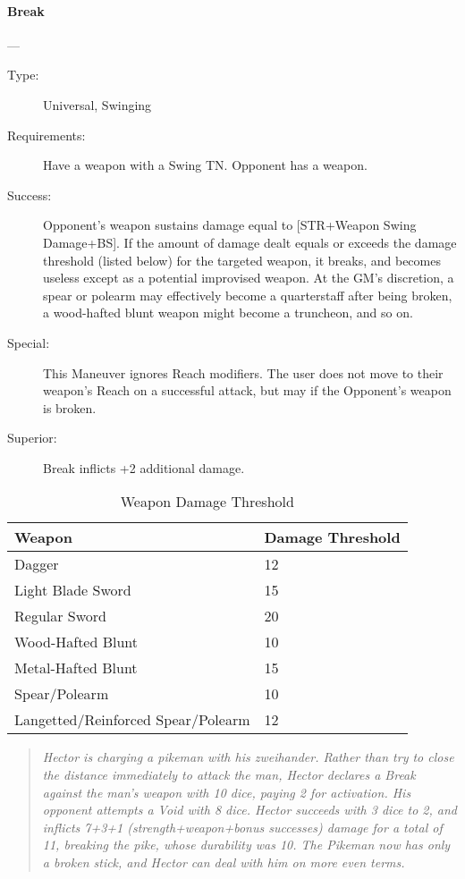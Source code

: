 \documentclass[oneside,11pt,english]{book}
\begin{document}
\paragraph{\large Break \label{man:Break}}---\quad{\large[X$ + $2]}
\vspace{-10pt}
\begin{description}
\item[Type:] Universal, Swinging
\item[Requirements:] Have a weapon with a Swing TN. Opponent has a weapon.
\item[Success:] Opponent’s weapon sustains damage equal to [STR+Weapon Swing
  Damage+BS]. If the amount of damage dealt equals or exceeds the damage
  threshold (listed below) for the targeted weapon, it breaks, and becomes
  useless except as a potential improvised weapon. At the GM’s discretion, a
  spear or polearm may effectively become a quarterstaff after being broken, a
  wood-hafted blunt weapon might become a truncheon, and so on.  
\item[Special:] This Maneuver ignores Reach modifiers. The user does not move to
  their weapon’s Reach on a successful attack, but may if the Opponent’s weapon
  is broken.  
\item[Superior:] Break inflicts +2 additional damage. 
\end{description}

\begin{table}[!hb]
  \centering
  \caption{Weapon Damage Threshold}
  \label{tab:Weapon Damage Threshold}
  \begin{tabu} spread 0pt {XX[-1,r]}
    Weapon&Damage Threshold \\\toprule
    Dagger&12\\
    Light Blade Sword &15 \\
    Regular Sword &20 \\
    Wood-Hafted Blunt &10 \\
    Metal-Hafted Blunt&15 \\
    Spear/Polearm&10\\
    Langetted/Reinforced Spear/Polearm&12 \\
  \end{tabu}
\end{table}

\begin{quotation}
  \emph{Hector is charging a pikeman with his zweihander. Rather than try to close the distance immediately to attack the man, Hector declares a Break against the man’s weapon with 10 dice, paying 2 for activation. His opponent attempts a Void with 8 dice. Hector succeeds with 3 dice to 2, and inflicts 7+3+1 (strength+weapon+bonus successes) damage for a total of 11, breaking the pike, whose durability was 10. The Pikeman now has only a broken stick, and Hector can deal with him on more even terms.}
\end{quotation}
\end{document}

